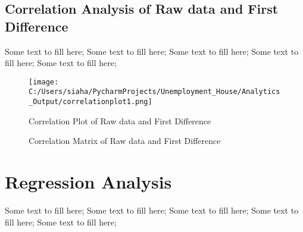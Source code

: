 \documentclass[twocolumn,12pt]{article}
\begin{document}
\subsection*{\textcolor{indigo(dye)}{Correlation Analysis of Raw data and First Difference}}

Some text to fill here; Some text to fill here; Some text to fill here; Some text to fill here; Some text to fill here; 

\begin{figure}[H]
\centering
\texttt{[image: C:/Users/siaha/PycharmProjects/Unemployment\_House/Analytics\_Output/correlationplot1.png]}
\caption{Correlation Plot of Raw data and First Difference }
\end{figure}

\begin{figure}[H]
\centering
{}
\caption{Correlation Matrix of Raw data and First Difference}
\end{figure}

\section*{\textcolor{indigo(dye)}{Regression Analysis}}

Some text to fill here; Some text to fill here; Some text to fill here; Some text to fill here; Some text to fill here; 
\end{document}
